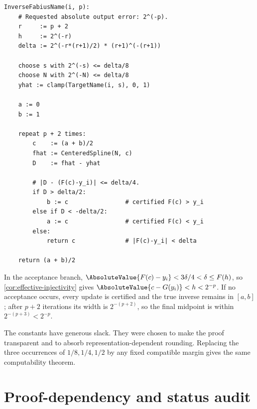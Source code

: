 \documentclass[11pt,oneside]{article}
\theoremstyle{definition}
\theoremstyle{remark}
\numberwithin{equation}{section}
\begin{document}
\begin{lstlisting}[style=reportpseudo,language={}]
InverseFabiusName(i, p):
    # Requested absolute output error: 2^(-p).
    r     := p + 2
    h     := 2^(-r)
    delta := 2^(-r*(r+1)/2) * (r+1)^(-(r+1))

    choose s with 2^(-s) <= delta/8
    choose N with 2^(-N) <= delta/8
    yhat := clamp(TargetName(i, s), 0, 1)

    a := 0
    b := 1

    repeat p + 2 times:
        c    := (a + b)/2
        fhat := CenteredSpline(N, c)
        D    := fhat - yhat

        # |D - (F(c)-y_i)| <= delta/4.
        if D > delta/2:
            b := c                # certified F(c) > y_i
        else if D < -delta/2:
            a := c                # certified F(c) < y_i
        else:
            return c              # |F(c)-y_i| < delta

    return (a + b)/2
\end{lstlisting}

In the acceptance branch,
$\AbsoluteValue{F(c)-y_i}<3\delta/4<\delta\le F(h)$, so
\cref{cor:effective-injectivity} gives
$\AbsoluteValue{c-G(y_i)}<h<2^{-p}$.  If no acceptance occurs, every update is
certified and the true inverse remains in $[a,b]$; after $p+2$ iterations its
width is $2^{-(p+2)}$, so the final midpoint is within
$2^{-(p+3)}<2^{-p}$.

The constants have generous slack.  They were chosen to make the proof
transparent and to absorb representation-dependent rounding.  Replacing the
three occurrences of $1/8,1/4,1/2$ by any fixed compatible margin gives the
same computability theorem.

\section{Proof-dependency and status audit}
\label{app:dependency-audit}
\end{document}
